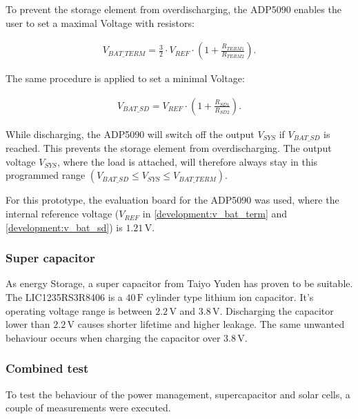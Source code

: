 To prevent the storage element from overdischarging, the ADP5090 enables the user to set a maximal Voltage with resistors:

\begin{align}
	V_{BAT\_TERM} = \frac{3}{2}\cdot V_{REF}\cdot\left(1+\frac{R_{TERM1}}{R_{TERM2}} \right).\label{development:v_bat_term} 
\end{align} 

The same procedure is applied to set a minimal Voltage:

\begin{align}
	V_{BAT\_SD}=V_{REF}\cdot \left(1+\frac{R_{SD1}}{R_{SD2}} \right).\label{development:v_bat_sd} 
\end{align}  

While discharging, the ADP5090 will switch off the output $V_{SYS}$ if $V_{BAT\_SD}$ is reached. This prevents the storage element from overdischarging.
The output voltage $V_{SYS}$, where the load is attached, will therefore always stay in this programmed range $(V_{BAT\_SD}\le V_{SYS}\le V_{BAT\_TERM})$.
\cite{adp}

For this prototype, the evaluation board for the ADP5090 was used, where the internal reference voltage ($V_{REF}$ in \eqref{development:v_bat_term} and \eqref{development:v_bat_sd}) is $1.21\,\text{V}$. \cite{adp_eval}

\subsubsection{Super capacitor}
As energy Storage, a super capacitor from Taiyo Yuden has proven to be suitable.
The LIC1235RS3R8406 is a $40\,\text{F}$ cylinder type lithium ion capacitor.
It's operating voltage range is between $2.2\,\text{V}$ and $3.8\,\text{V}$.
Discharging the capacitor lower than $2.2\,\text{V}$ causes shorter lifetime and higher leakage.
The same unwanted behaviour occurs when charging the capacitor over $3.8\,\text{V}$.
\cites{yuden}

\subsubsection{Combined test}
To test the behaviour of the power management, supercapacitor and solar cells, a couple of measurements were executed.

